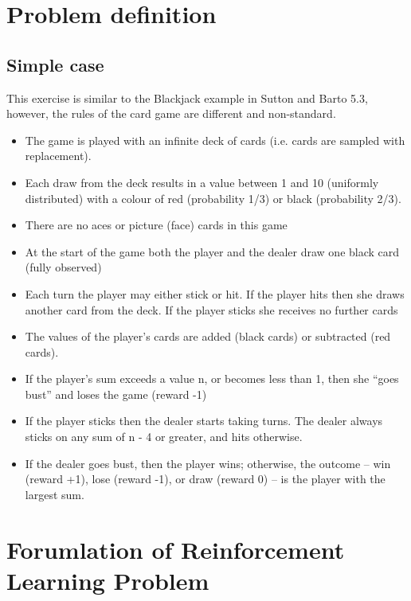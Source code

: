 \documentclass[12pt,a4paper]{article}
\begin{document}
\newpage
\section{Problem definition}

\subsection{Simple case}
This exercise is similar to the Blackjack
example in Sutton and Barto 5.3, however, the rules of the
card game are different and non-standard.
\begin{itemize}
\item The game is played with an infinite deck of cards (i.e. cards are sampled
with replacement). 
\item Each draw from the deck results in a value between 1 and 10 (uniformly
distributed) with a colour of red (probability 1/3) or black (probability
2/3). 
\item There are no aces or picture (face) cards in this game
\item At the start of the game both the player and the dealer draw one black
card (fully observed)
\item Each turn the player may either stick or hit. If the player hits then she draws another card from the deck. If the player sticks she receives no further cards
\item The values of the player’s cards are added (black cards) or subtracted (red
cards). 
\item If the player’s sum exceeds a value n, or becomes less than 1, then she “goes
bust” and loses the game (reward -1)
\item If the player sticks then the dealer starts taking turns. The dealer always
sticks on any sum of n - 4 or greater, and hits otherwise.
\item If the dealer goes
bust, then the player wins; otherwise, the outcome – win (reward +1),
lose (reward -1), or draw (reward 0) – is the player with the largest sum.
\end{itemize} 
\newpage

\section{Forumlation of Reinforcement Learning Problem}
\end{document}
